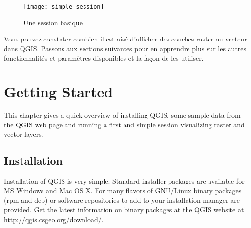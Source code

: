 

\begin{figure}[ht]    \begin{center}    \caption{Une session basique \nixcaption}\label{fig:simple_session}\smallskip    \texttt{[image: simple\_session]} \end{center}   \end{figure}

Vous pouvez constater combien il est aisé d'afficher des couches raster ou vecteur dans QGIS. Passons aux sections suivantes pour en apprendre plus sur les autres fonctionnalités et paramètres disponibles et la façon de les utiliser.%

\section{Getting Started}\label{label_getstarted}


This chapter gives a quick overview of installing QGIS, some sample 
data from the QGIS web page and running a first and simple session 
visualizing raster and vector layers.

\subsection{Installation}\label{label_installation}

Installation of QGIS is very simple. Standard installer packages are
available for MS Windows and Mac OS X. For many flavors of GNU/Linux binary
packages (rpm and deb) or software repositories to add to your installation
manager are provided. Get the latest information on binary packages at the
QGIS website at \url{http://qgis.osgeo.org/download/}.

